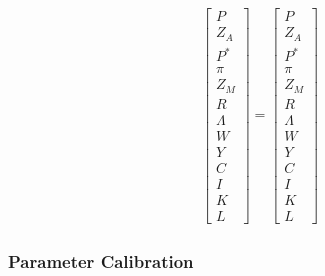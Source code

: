 \documentclass[
	12pt, 
	]{article}
\numberwithin{equation}{section}
\theoremstyle{definition}
\theoremstyle{plain}
\theoremstyle{plain}
\theoremstyle{plain}
\begin{document}
\vspace*{-1cm}

\begin{align}
	\begin{bmatrix}
		P \\
		Z_A \\
		P^\ast \\
		\pi \\
		Z_M \\
		R \\
		\Lambda \\
		W \\
		Y \\
		C \\
		I \\
		K \\
		L
	\end{bmatrix} = 
	\begin{bmatrix}
		P \\
		Z_A \\
		P^\ast \\
		\pi \\
		Z_M \\
		R \\
		\Lambda \\
		W \\
		Y \\
		C \\
		I \\
		K \\
		L
	\end{bmatrix}
\end{align}

\newpage


\subsubsection{Parameter Calibration}

\vspace*{0.5cm}
\end{document}
